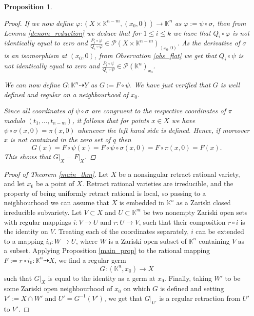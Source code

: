 \documentclass{amsart}
\theoremstyle{plain}
\newtheorem{prop}[thm]{Proposition}
\theoremstyle{definition}
\theoremstyle{remark}
\numberwithin{equation}{section}
\newcommand{\K}{\mathbb{K}}
\newcommand{\PP}{\mathcal{P}}
\begin{document}
\begin{prop}
\begin{proof}
If we now define $\varphi:(X\times\K^{n-m},(x_0,0))\rightarrow \K^n$ as $\varphi:=\psi\circ\sigma$, then from Lemma \ref{denom_reduction} we deduce that for $1\leq i \leq k$ we have that $Q_i\circ\varphi$ is not identically equal to zero and $\frac{P_i\circ\varphi}{Q_i\circ\varphi}\in\PP(X\times \K^{n-m})_{(x_0,0)}$. As the derivative of $\sigma$ is an isomorphism at $(x_0,0)$, from Observation \ref{obs_flat} we get that $Q_i\circ \psi$ is not identically equal to zero and $\frac{P_i\circ \psi}{Q_i\circ \psi} \in \PP(\K^n)_{x_0}$.

We can now define $G:\K^n\dashrightarrow Y$ as $G:=F\circ \psi$. We have just verified that $G$ is well defined and regular on a neighbourhood of $x_0$. 

Since all coordinates of $\psi\circ\sigma$ are congruent to the respective coordinates of $\pi$ modulo $(t_1,\dots,t_{n-m})$, it follows that for points $x\in X$ we have $\psi\circ \sigma(x,0)=\pi(x,0)$ whenever the left hand side is defined. Hence, if moreover $x$ is not contained in the zero set of $q$ then
\begin{equation*}
	G(x)=F\circ\psi(x)=F\circ\psi\circ\sigma(x,0)=F\circ\pi(x,0)=F(x).
\end{equation*}
This shows that $G\vert_X=F\vert_X$.
\end{proof}
\end{prop}

\begin{proof}[Proof of Theorem \ref{main_thm}]
Let $X$ be a nonsingular retract rational variety, and let $x_0$ be a point of $X$. Retract rational varieties are irreducible, and the property of being uniformly retract rational is local, so passing to a neighbourhood we can assume that $X$ is embedded in $\K^n$ as a Zariski closed irreducible subvariety. Let $V\subset X$ and $U\subset \K^m$ be two nonempty Zariski open sets with regular mappings $i:V\rightarrow U$ and $r:U\rightarrow V$, such that their composition $r\circ i$ is the identity on $V$. Treating each of the coordinates separately, $i$ can be extended to a mapping $i_0:W\rightarrow U$, where $W$ is a Zariski open subset of $\K^n$ containing $V$ as a subset. Applying Proposition \ref{main_prop} to the rational mapping $F:=r\circ i_0:\K^n\dashrightarrow X$, we find a regular germ 
\begin{equation*}
    G:(\K^n,x_0)\rightarrow X
\end{equation*}
such that $G\vert_X$ is equal to the identity as a germ at $x_0$. Finally, taking $W'$ to be some Zariski open neighbourhood of $x_0$ on which $G$ is defined and setting $V':=X\cap W'$ and $U'=G^{-1}(V')$, we get that $G\vert_{U'}$ is a regular retraction from $U'$ to $V'$.
\end{proof}



\end{document}
